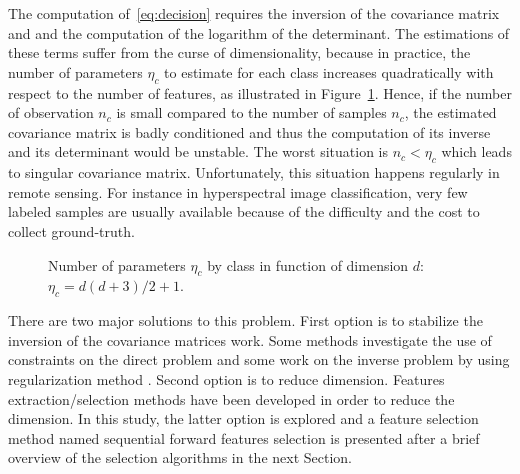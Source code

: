\documentclass[journal,peerreview,onecolumn]{IEEEtran}
\begin{document}
    The computation of~\ref{eq:decision} requires the inversion of the
    covariance matrix and and the  computation of the logarithm of the
    determinant.  The estimations of these terms suffer from the curse
    of  dimensionality\cite{bouveyron2014model}, because  in practice,
    the  number of  parameters  $\eta_c$ to  estimate  for each  class
    increases quadratically with respect to the number of features, as
    illustrated in Figure~\ref{fig:nb-param}.  Hence, if the number of
    observation  $n_c$ is  small  compared to  the  number of  samples
    $n_c$, the  estimated covariance  matrix is badly  conditioned and
    thus the computation  of its inverse and its  determinant would be
    unstable.   The worst  situation  is $n_c<\eta_c$  which leads  to
    singular covariance matrix.  Unfortunately, this situation happens
    regularly in remote sensing.   For instance in hyperspectral image
    classification,  very few  labeled samples  are usually  available
    because of the difficulty and the cost to collect ground-truth.

    \begin{figure}[!t]
        \centering
        \caption{Number of parameters $\eta_c$ by class in function of dimension $d$: $\eta_c=d(d+3)/2+1$.\label{fig:nb-param}}
    \end{figure}

    There are two major  solutions to this problem. First option is to stabilize the inversion of the covariance matrices work. Some methods investigate the use of constraints on the direct problem \cite{reynolds1995robust} \cite{hathaway1985constrained} and some work on the inverse problem by using regularization method \cite{hoerl1970ridge} \cite{jensen2008regression}. Second option is to reduce dimension. Features extraction/selection methods have been developed in order to reduce the dimension. In this  study, the latter option is explored and a feature selection method named sequential forward features selection is presented after a brief overview of the selection algorithms in the next Section. %
\end{document}
